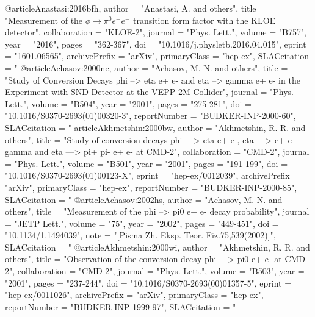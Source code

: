 @article{Anastasi:2016bfh,
      author         = "Anastasi, A. and others",
      title          = "{Measurement of the $\phi \to \pi^0 e^+e^-$ transition
                        form factor with the KLOE detector}",
      collaboration  = "KLOE-2",
      journal        = "Phys. Lett.",
      volume         = "B757",
      year           = "2016",
      pages          = "362-367",
      doi            = "10.1016/j.physletb.2016.04.015",
      eprint         = "1601.06565",
      archivePrefix  = "arXiv",
      primaryClass   = "hep-ex",
      SLACcitation   = "%
}
@article{Achasov:2000ne,
      author         = "Achasov, M. N. and others",
      title          = "{Study of Conversion Decays phi --> eta e+ e- and eta -->
                        gamma e+ e- in the Experiment with SND Detector at the
                        VEPP-2M Collider}",
      journal        = "Phys. Lett.",
      volume         = "B504",
      year           = "2001",
      pages          = "275-281",
      doi            = "10.1016/S0370-2693(01)00320-3",
      reportNumber   = "BUDKER-INP-2000-60",
      SLACcitation   = "%
}
article{Akhmetshin:2000bw,
      author         = "Akhmetshin, R. R. and others",
      title          = "{Study of conversion decays phi ---> eta e+ e-, eta --->
                        e+ e- gamma and eta ---> pi+ pi- e+ e- at CMD-2}",
      collaboration  = "CMD-2",
      journal        = "Phys. Lett.",
      volume         = "B501",
      year           = "2001",
      pages          = "191-199",
      doi            = "10.1016/S0370-2693(01)00123-X",
      eprint         = "hep-ex/0012039",
      archivePrefix  = "arXiv",
      primaryClass   = "hep-ex",
      reportNumber   = "BUDKER-INP-2000-85",
      SLACcitation   = "%
}
@article{Achasov:2002hs,
      author         = "Achasov, M. N. and others",
      title          = "{Measurement of the phi --> pi0 e+ e- decay probability}",
      journal        = "JETP Lett.",
      volume         = "75",
      year           = "2002",
      pages          = "449-451",
      doi            = "10.1134/1.1494039",
      note           = "[Pisma Zh. Eksp. Teor. Fiz.75,539(2002)]",
      SLACcitation   = "%
}
@article{Akhmetshin:2000wi,
      author         = "Akhmetshin, R. R. and others",
      title          = "{Observation of the conversion decay phi ---> pi0 e+ e-
                        at CMD-2}",
      collaboration  = "CMD-2",
      journal        = "Phys. Lett.",
      volume         = "B503",
      year           = "2001",
      pages          = "237-244",
      doi            = "10.1016/S0370-2693(00)01357-5",
      eprint         = "hep-ex/0011026",
      archivePrefix  = "arXiv",
      primaryClass   = "hep-ex",
      reportNumber   = "BUDKER-INP-1999-97",
      SLACcitation   = "%
}
